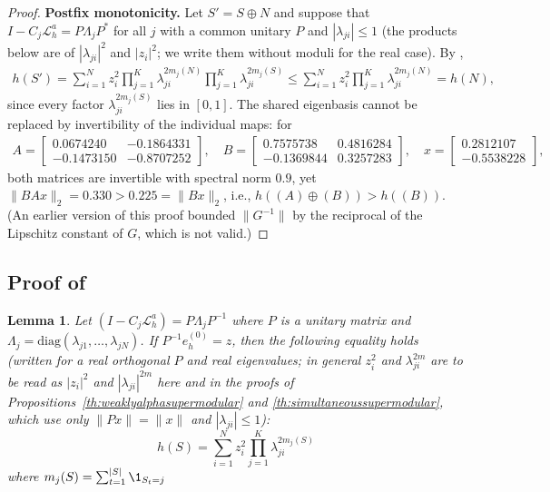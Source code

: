\documentclass{article}
\newcommand{\edit}[1]{{\color{red}#1}}
\newtheorem{lemma}[theorem]{Lemma}
\begin{document}
\begin{proof}
\edit{\textbf{Postfix monotonicity.} Let $S' = S \oplus N$ and suppose that $I - C_j\mathcal{L}_h^a = P\Lambda_jP^{*}$ for all $j$ with a common unitary $P$ and $|\lambda_{ji}| \le 1$ (the products below are of $|\lambda_{ji}|^2$ and $|z_i|^2$; we write them without moduli for the real case). By \Cref{th:simultaneousallocation},
\begin{align*}
    h(S') = \sum_{i = 1}^N z_i^2 \prod_{j = 1}^K \lambda_{ji}^{2 m_j(N)} \prod_{j = 1}^K \lambda_{ji}^{2 m_j(S)} \le \sum_{i = 1}^N z_i^2 \prod_{j = 1}^K \lambda_{ji}^{2 m_j(N)} = h(N),
\end{align*}
since every factor $\lambda_{ji}^{2 m_j(S)}$ lies in $[0, 1]$. The shared eigenbasis cannot be replaced by invertibility of the individual maps: for
\begin{align*}
    A = \begin{bmatrix} 0.0674240 & -0.1864331 \\ -0.1473150 & -0.8707252 \end{bmatrix}, \quad
    B = \begin{bmatrix} 0.7575738 & 0.4816284 \\ -0.1369844 & 0.3257283 \end{bmatrix}, \quad
    x = \begin{bmatrix} 0.2812107 \\ -0.5538228 \end{bmatrix},
\end{align*}
both matrices are invertible with spectral norm $0.9$, yet $\|BAx\|_2 = 0.330 > 0.225 = \|Bx\|_2$, i.e., $h((A) \oplus (B)) > h((B))$. (An earlier version of this proof bounded $\|G^{-1}\|$ by the reciprocal of the Lipschitz constant of $G$, which is not valid.)}

\end{proof}

\subsection{Proof of } \label{sec:proofsimultaneousallocation}

\begin{lemma} \label{th:simultaneousallocation}
     Let $\left(I - C_j \mathcal{L}_{h}^a\right) = P\Lambda_jP^{-1}$ where $P$ is a unitary matrix and $\Lambda_j = \mathrm{diag}(\lambda_{j1}, \dots, \lambda_{jN})$. If $P^{-1}e^{(0)}_h = z$, then the following equality holds \edit{(written for a real orthogonal $P$ and real eigenvalues; in general $z_i^2$ and $\lambda_{ji}^{2m}$ are to be read as $|z_i|^2$ and $|\lambda_{ji}|^{2m}$ here and in the proofs of Propositions~\ref{th:weaklyalphasupermodular} and \ref{th:simultaneoussupermodular}, which use only $\|Px\| = \|x\|$ and $|\lambda_{ji}| \le 1$)}:
     \begin{equation} \label{eq:simultaneous}
          h(S) = \sum_{i = 1}^N z_i^2 \prod_{j = 1}^K \lambda_{ji}^{2m_j(S)}
     \end{equation}
     where $m_j(S) = \sum_{t= 1}^{|S|}\1_{S_t = j}$
\end{lemma}
\end{document}
